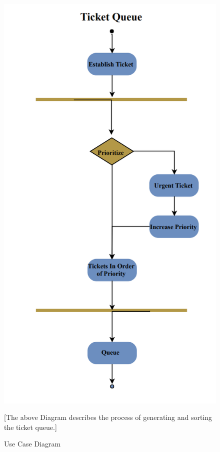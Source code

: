 \documentclass[letterpaper]{article}
\begin{document}
\begin{figure}[htbp]
  \includegraphics[]{AD_TicketQueue}
  \caption{Use Case Diagram}[The above Diagram describes the process of generating and sorting the ticket queue.]
  \centering
\end{figure}
\end{document}
